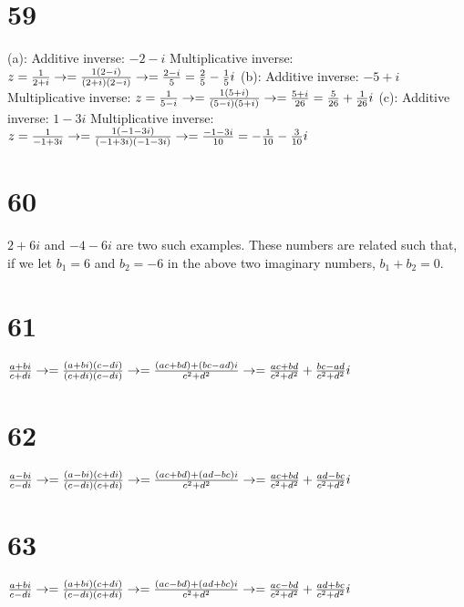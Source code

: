 \documentclass{article}
\theoremstyle{definition}
\begin{document}
\section*{59}
(a): Additive inverse: $-2-i$ Multiplicative inverse: $z=\frac{1}{2+i}\newline\rightarrow =\frac{1(2-i)}{(2+i)(2-i)}\newline\rightarrow =
\frac{2-i}{5}=\frac{2}{5}-\frac{1}{5}i$\newline
(b): Additive inverse: $-5+i$ Multiplicative inverse: $z=\frac{1}{5-i}\newline\rightarrow =\frac{1(5+i)}{(5-i)(5+i)}\newline\rightarrow =
\frac{5+i}{26}=\frac{5}{26}+\frac{1}{26}i$\newline
(c): Additive inverse: $1-3i$ Multiplicative inverse: $z=\frac{1}{-1+3i}\newline\rightarrow =\frac{1(-1-3i)}{(-1+3i)(-1-3i)}\newline
\rightarrow =\frac{-1-3i}{10}=-\frac{1}{10}-\frac{3}{10}i$

\section*{60}
$2+6i$ and $-4-6i$ are two such examples. These numbers are related such that, if we let $b_1=6$ and $b_2=-6$ in the above two 
imaginary numbers, $b_1+b_2=0$.

\section*{61} 
$\frac{a+bi}{c+di}\newline\rightarrow =\frac{(a+bi)(c-di)}{(c+di)(c-di)}\newline\rightarrow =\frac{(ac+bd)+(bc-ad)i}{c^2+d^2}
\newline\rightarrow
 =
\frac{ac+bd}{c^2+d^2}+\frac{bc-ad}{c^2+d^2}i$

\section*{62}
$\frac{a-bi}{c-di}\newline\rightarrow =\frac{(a-bi)(c+di)}{(c-di)(c+di)}\newline\rightarrow =\frac{(ac+bd)+(ad-bc)i}{c^2+d^2}\newline
\rightarrow =
\frac{ac+bd}{c^2+d^2}+\frac{ad-bc}{c^2+d^2}i$

\section*{63}
$\frac{a+bi}{c-di}\newline\rightarrow =\frac{(a+bi)(c+di)}{(c-di)(c+di)}\newline\rightarrow =\frac{(ac-bd)+(ad+bc)i}{c^2+d^2}\newline
\rightarrow =
\frac{ac-bd}{c^2+d^2}+\frac{ad+bc}{c^2+d^2}i$
\end{document}
